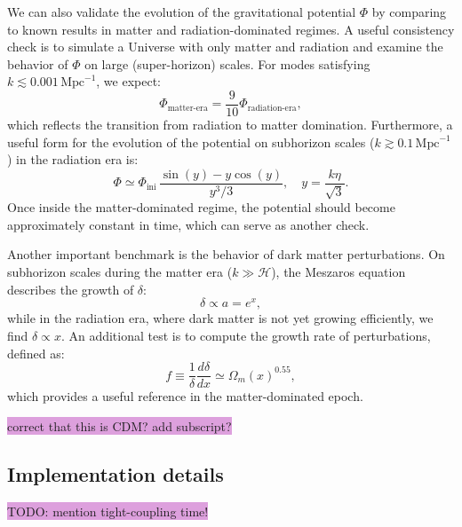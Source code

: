 \documentclass{aa}
\numberwithin{equation}{section}
\numberwithin{table}{section}
\numberwithin{figure}{section}
\begin{document}
We can also validate the evolution of the gravitational potential $\Phi$ by comparing to known results in matter and radiation-dominated regimes. A useful consistency check is to simulate a Universe with only matter and radiation and examine the behavior of $\Phi$ on large (super-horizon) scales. For modes satisfying $k \lesssim 0.001\,\text{Mpc}^{-1}$, we expect:
\begin{equation}
\Phi_\text{matter-era} = \frac{9}{10} \Phi_\text{radiation-era},
\end{equation}
which reflects the transition from radiation to matter domination. Furthermore, a useful form for the evolution of the potential on subhorizon scales ($k \gtrsim 0.1\,\text{Mpc}^{-1}$) in the radiation era is:
\begin{equation}
\Phi \simeq \Phi_\text{ini} \, \frac{\sin(y) - y \cos(y)}{y^3 / 3}, \quad y = \frac{k\eta}{\sqrt{3}}.
\end{equation}
Once inside the matter-dominated regime, the potential should become approximately constant in time, which can serve as another check.

Another important benchmark is the behavior of dark matter perturbations. On subhorizon scales during the matter era ($k \gg \mathcal{H}$), the Meszaros equation describes the growth of $\delta$:
\begin{equation}
\delta \propto a = e^x,
\end{equation}
while in the radiation era, where dark matter is not yet growing efficiently, we find $\delta \propto x$. An additional test is to compute the growth rate of perturbations, defined as:
\begin{equation}
f \equiv \frac{1}{\delta} \frac{d\delta}{dx} \simeq \Omega_m(x)^{0.55},
\end{equation}
which provides a useful reference in the matter-dominated epoch.

\colorbox{Plum}{correct that this is CDM? add subscript?}



\subsection{Implementation details}\label{subsec: III methods}
\colorbox{Plum}{TODO: mention tight-coupling time!}
\end{document}
